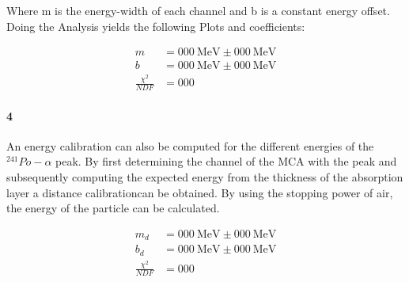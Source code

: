 \documentclass[12pt,twoside,a4paper]{scrartcl}
\begin{document}
			Where m is the energy-width of each channel and b is a constant energy offset.
			Doing the Analysis yields the following Plots and coefficients:

			\begin{figure}[H]
					\begin{minipage}{0.69 \textwidth}
					\end{minipage}
					\begin{minipage}{0.29 \textwidth}
						\begin{align*}
							m &= \SI{000}{\mega \electronvolt} \pm \SI{000}{\mega \electronvolt} \\
							b &= \SI{000}{\mega \electronvolt} \pm \SI{000}{\mega \electronvolt} \\
							\frac{\chi^2}{NDF} &= 000
						\end{align*}
					\end{minipage}
				\end{figure}

		\paragraph{4}

			An energy calibration can also be computed for the different energies of the $^{241}Po-\alpha$ peak. By first determining the channel of the MCA with the peak and subsequently computing the expected energy from the thickness of the absorption layer a distance calibrationcan be obtained. By using the stopping power of air, the energy of the particle can be calculated.

			\begin{figure}[H]
					\begin{minipage}{0.69 \textwidth}
					\end{minipage}
					\begin{minipage}{0.29 \textwidth}
						\begin{align*}
							m_d &= \SI{000}{\mega \electronvolt} \pm \SI{000}{\mega \electronvolt} \\
							b_d &= \SI{000}{\mega \electronvolt} \pm \SI{000}{\mega \electronvolt} \\
							\frac{\chi^2}{NDF} &= 000
						\end{align*}
					\end{minipage}
				\end{figure}
\end{document}
